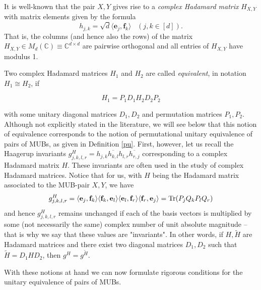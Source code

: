 \documentclass[12pt]{amsart}
\numberwithin{equation}{section}
\theoremstyle{definition}
\theoremstyle{remark}
\theoremstyle{remark}
\newcommand{\CC}{\ensuremath{\mathbb{C}}}
\newcommand{\eb}{\ensuremath{\mathbf{e}}}
\newcommand{\fb}{\ensuremath{\mathbf{f}}}
\begin{document}
\medskip

It is well-known that the  pair $X, Y$ gives rise to a {\it complex Hadamard matrix} $H_{X,Y}$ with matrix elements given by the formula
\begin{equation}\label{had}
h_{j,k}=\sqrt{d}\langle\eb_j,\fb_k \rangle \; \;  \;
(j,k\in [d]).    
\end{equation}
 That is, the columns (and hence also the rows) of the matrix $H_{X,Y}\in M_d(\CC)\equiv \CC^{d\times d}$ are pairwise orthogonal and all entries of $H_{X,Y}$ have modulus 1. 

\medskip

Two complex Hadamard matrices $H_1$ and $H_2$ are called {\it equivalent}, in notation $H_1\cong H_2$, if

\begin{equation}\label{eqhad}
H_1=P_1 D_1 H_2 D_2 P_2    
\end{equation}

with some unitary diagonal matrices $D_1, D_2$
and permutation matrices $P_1, P_2$. Although not explicitly stated in the literature, we will see below that this notion of equivalence corresponds to the notion of permutational unitary equivalence of pairs of MUBs, as given in Definition \ref{pu}. First, however, let us recall the Haagerup invariants $g^H_{j,k,l,r}=h_{j,k}\overline{h_{k,l}}h_{l,r}\overline{h_{r,j}}$ corresponding to a complex Hadamard matrix $H$.
These invariants are often used in the study of complex Hadamard matrices. Notice that for us, with $H$ being the Hadamard matrix associated to the MUB-pair $X,Y$, we have 
\begin{equation}\label{haag}
g^H_{j,k,l,r}=\langle \eb_j, \fb_k\rangle \langle \fb_k, \eb_l \rangle \langle \eb_l, \fb_r\rangle \langle \fb_r, \eb_j\rangle ={\rm Tr}(P_j Q_k P_l Q_r)
\end{equation}
and hence $g^H_{j,k,l,r}$ remains unchanged if each of the basis vectors is multiplied by some (not necessarily the same) complex number of unit absolute magnitude -- that is why we say that these values are "invariants". In other words, if $H,\tilde{H}$ are Hadamard matrices and there exist two diagonal matrices $D_1,D_2$ such that $\tilde{H}=D_1 H D_2$, then $g^H=g^{\tilde{H}}$. 
\medskip

With these notions at hand we can now formulate rigorous conditions for the unitary equivalence of pairs of MUBs.
\end{document}
